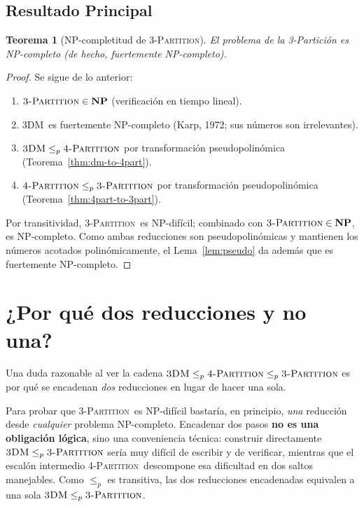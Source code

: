 \documentclass[12pt,a4paper]{article}
\newtheorem{theorem}{Teorema}
\theoremstyle{definition}
\theoremstyle{remark}
\newcommand{\TPART}{\textsc{3-Partition}}
\newcommand{\FPART}{\textsc{4-Partition}}
\newcommand{\DM}{\textsc{3DM}}
\begin{document}
\subsection{Resultado Principal}

\begin{theorem}[NP-completitud de \TPART]
El problema de la 3-Partición es NP-completo (de hecho, fuertemente NP-completo).
\end{theorem}

\begin{proof}
Se sigue de lo anterior:
\begin{enumerate}
  \item $\TPART \in \mathbf{NP}$ (verificación en tiempo lineal).
  \item \DM\ es fuertemente NP-completo (Karp, 1972; sus números son irrelevantes).
  \item $\DM \leq_p \FPART$ por transformación pseudopolinómica
        (Teorema~\ref{thm:dm-to-4part}).
  \item $\FPART \leq_p \TPART$ por transformación pseudopolinómica
        (Teorema~\ref{thm:4part-to-3part}).
\end{enumerate}
Por transitividad, \TPART\ es NP-difícil; combinado con $\TPART \in \mathbf{NP}$,
es NP-completo. Como ambas reducciones son pseudopolinómicas y mantienen los
números acotados polinómicamente, el Lema~\ref{lem:pseudo} da además que es
fuertemente NP-completo.
\end{proof}

\section{¿Por qué dos reducciones y no una?}
\label{sec:dos-reducciones}

Una duda razonable al ver la cadena $\DM \leq_p \FPART \leq_p \TPART$ es por qué
se encadenan \emph{dos} reducciones en lugar de hacer una sola.

Para probar que \TPART\ es NP-difícil bastaría, en principio, \emph{una} reducción
desde \emph{cualquier} problema NP-completo. Encadenar dos pasos \textbf{no es una
obligación lógica}, sino una conveniencia técnica: construir directamente
$\DM \leq_p \TPART$ sería muy difícil de escribir y de verificar, mientras que el
escalón intermedio \FPART\ descompone esa dificultad en dos saltos manejables.
Como $\leq_p$ es transitiva, las dos reducciones encadenadas equivalen a una sola
$\DM \leq_p \TPART$.
\end{document}
